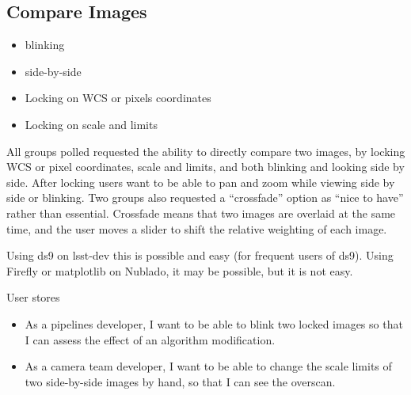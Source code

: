 \subsection{Compare Images}
\begin{itemize}
\item{blinking}
\item{side-by-side}
\item{Locking on WCS or pixels coordinates}
\item{Locking on scale and limits}
\end{itemize}

All groups polled requested the ability to directly compare two images, by locking WCS or pixel coordinates, scale and limits, and both blinking and looking side by side.
After locking users want to be able to pan and zoom while viewing side by side or blinking.
Two groups also requested a ``crossfade'' option as ``nice to have'' rather than essential.
Crossfade means that two images are overlaid at the same time, and the user moves a slider to shift the relative weighting of each image.

Using ds9 on lsst-dev this is possible and easy (for frequent users of ds9).
Using Firefly or matplotlib on Nublado, it may be possible, but it is not easy.

User stores
\begin{itemize}
\item{As a pipelines developer,  I want to be able to blink two locked images so that I can assess the effect of an algorithm modification.}
\item{As a camera team developer,  I want to be able to change the scale limits of two side-by-side images by hand, so that I can see the overscan.}
\end{itemize}

